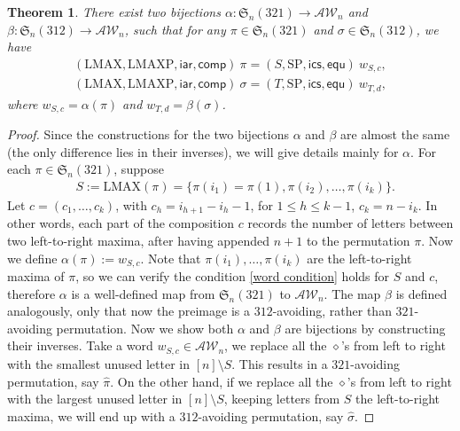 \documentclass[12pt]{amsart}
\numberwithin{equation}{section}
\theoremstyle{plain}
\newtheorem{theorem}{Theorem}[section]
\theoremstyle{definition}
\def\S{\mathfrak{S}}
\def\iar{\mathsf{iar}}
\def\comp{\mathsf{comp}}
\def\LMAX{\mathrm{LMAX}}
\def\LMAXP{\mathrm{LMAXP}}
\def\AW{\mathcal{AW}}
\def\ics{\mathsf{ics}}
\def\equ{\mathsf{equ}}
\def\SP{\mathrm{SP}}
\begin{document}
\begin{theorem}\label{thm:alpha-beta}
There exist two bijections $\alpha:\S_n(321)\rightarrow \AW_n$ and $\beta:\S_n(312)\rightarrow \AW_n$, such that for any $\pi\in\S_n(321)$ and $\sigma\in\S_n(312)$, we have
\begin{align}
(\LMAX,\LMAXP,\iar,\comp)\:\pi = (S,\SP,\ics,\equ)\:w_{S,c},\label{eq:alpha} \\
(\LMAX,\LMAXP,\iar,\comp)\:\sigma = (T,\SP,\ics,\equ)\:w_{T,d},\label{eq:beta}
\end{align}
where $w_{S,c}=\alpha(\pi)$ and $w_{T,d}=\beta(\sigma)$.
\end{theorem}
\begin{proof}
Since the constructions for the two bijections $\alpha$ and $\beta$ are almost the same (the only difference lies in their inverses), we will give details mainly for $\alpha$. For each $\pi\in\S_n(321)$, suppose
\begin{align*}
&S:=\LMAX(\pi)=\{\pi(i_1)=\pi(1),\pi(i_2),\ldots,\pi(i_k)\}.
\end{align*} 
Let $c=(c_1,\ldots,c_k)$, with $c_h=i_{h+1}-i_h-1$, for $1\le h\le k-1$, $c_k=n-i_k$. In other words, each part of the composition $c$ records the number of letters between two left-to-right maxima, after having appended $n+1$ to the permutation $\pi$. Now we define $\alpha(\pi):=w_{S,c}.$ Note that $\pi(i_1),\ldots,\pi(i_k)$ are the left-to-right maxima of $\pi$, so we can verify the condition \eqref{word condition} holds for $S$ and $c$, therefore $\alpha$ is a well-defined map from $\S_n(321)$ to $\AW_n$. The map $\beta$ is defined analogously, only that now the preimage is a $312$-avoiding, rather than $321$-avoiding permutation. Now we show both $\alpha$ and $\beta$ are bijections by constructing their inverses. Take a word $w_{S,c}\in\AW_n$, we replace all the $\diamond$'s from left to right with the smallest unused letter in $[n]\setminus S$. This results in a $321$-avoiding permutation, say $\hat{\pi}$. On the other hand, if we replace all the $\diamond$'s from left to right with the largest unused letter in $[n]\setminus S$, keeping letters from $S$ the left-to-right maxima, we will end up with a $312$-avoiding permutation, say $\hat{\sigma}$. 




\end{proof}
\end{document}
